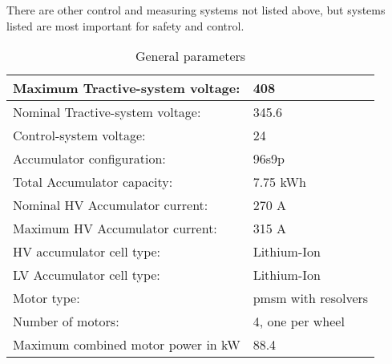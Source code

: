 There are other control and measuring systems not listed above, but systems listed are most important for safety and control.


\begin{table}[H]
	\centering
	\caption{General parameters}
	\begin{tabu}{|X|X|}
		\hline
		Maximum Tractive-system voltage: & 408 \vdc  \\
		\hline Nominal Tractive-system voltage: & 345.6 \vdc\\
		\hline
		Control-system voltage: & 24 \vdc \\
		\hline
		Accumulator configuration: & 96s9p \\
		\hline
		Total Accumulator capacity: & 7.75 kWh\\
		\hline
		Nominal HV Accumulator current: & 270 A \\
		\hline
		Maximum HV Accumulator current: & 315 A \\
		\hline
		HV accumulator cell type: & Lithium-Ion  \\
		\hline
		LV Accumulator cell type: & Lithium-Ion \\
		\hline
		Motor type: & \gls{pmsm} with resolvers \\
		\hline
		Number of motors: &  4, one per wheel \\
		\hline
		Maximum combined motor power in kW & 88.4 \\
		\hline
	\end{tabu}%
	\label{tab:system-general}%
\end{table}%
